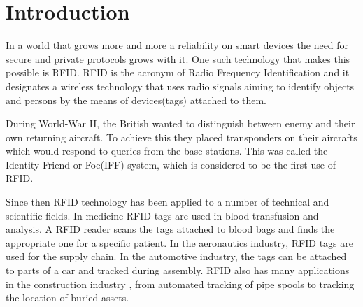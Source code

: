 \chapter*{Introduction} 

    In a world that grows more and more a reliability on smart devices the need for secure and private protocols grows with it. One 
such technology that makes this possible is RFID. RFID is the acronym of Radio Frequency Identification and it designates
a wireless technology that uses radio signals aiming to identify objects and persons by the means of devices(tags) attached to them.

    During World-War II, the British wanted to distinguish between enemy and their own returning aircraft. To achieve this they placed transponders
on their aircrafts which would respond to queries from the base stations. This was called the Identity Friend or Foe(IFF) system, which is considered to be the
first use of RFID.

    Since then RFID technology has been applied to a number of technical and scientific fields. In medicine RFID tags are used in blood transfusion and analysis. 
A RFID reader scans the tags attached to blood bags and finds the appropriate one for a specific patient. In the aeronautics industry, 
RFID tags are used for the supply chain. In the automotive industry, the tags can be attached to parts of a car and tracked during assembly.
RFID also has many applications in the construction industry \cite{Domdouzis}, from automated tracking of pipe spools to tracking the 
location of buried assets.
